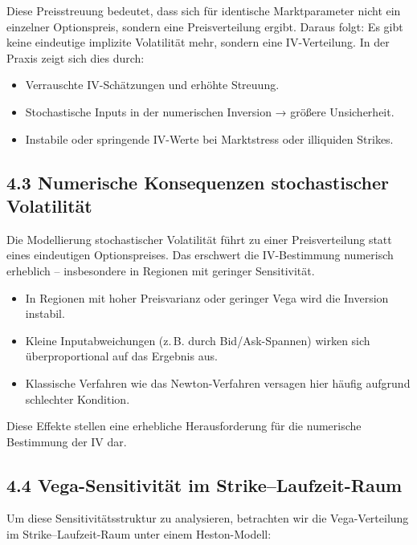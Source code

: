 \documentclass[a4paper,12pt]{article}
\begin{document}
Diese Preisstreuung bedeutet, dass sich für identische Marktparameter nicht ein einzelner Optionspreis, sondern eine Preisverteilung ergibt. Daraus folgt: Es gibt keine eindeutige implizite Volatilität mehr, sondern eine IV-Verteilung. In der Praxis zeigt sich dies durch:

\begin{itemize}
  \item Verrauschte IV-Schätzungen und erhöhte Streuung.
  \item Stochastische Inputs in der numerischen Inversion → größere Unsicherheit.
  \item Instabile oder springende IV-Werte bei Marktstress oder illiquiden Strikes.
\end{itemize}



\subsection*{4.3 Numerische Konsequenzen stochastischer Volatilität}

Die Modellierung stochastischer Volatilität führt zu einer Preisverteilung statt eines eindeutigen Optionspreises. Das erschwert die IV-Bestimmung numerisch erheblich – insbesondere in Regionen mit geringer Sensitivität.

\begin{itemize}
  \item In Regionen mit hoher Preisvarianz oder geringer Vega wird die Inversion instabil.
  \item Kleine Inputabweichungen (z.\,B. durch Bid/Ask-Spannen) wirken sich überproportional auf das Ergebnis aus.
  \item Klassische Verfahren wie das Newton-Verfahren versagen hier häufig aufgrund schlechter Kondition.
\end{itemize}
Diese Effekte stellen eine erhebliche Herausforderung für die numerische Bestimmung der IV dar.

\subsection*{4.4 Vega-Sensitivität im Strike–Laufzeit-Raum}

Um diese Sensitivitätsstruktur zu analysieren, betrachten wir die Vega-Verteilung im Strike–Laufzeit-Raum unter einem Heston-Modell:
\end{document}
